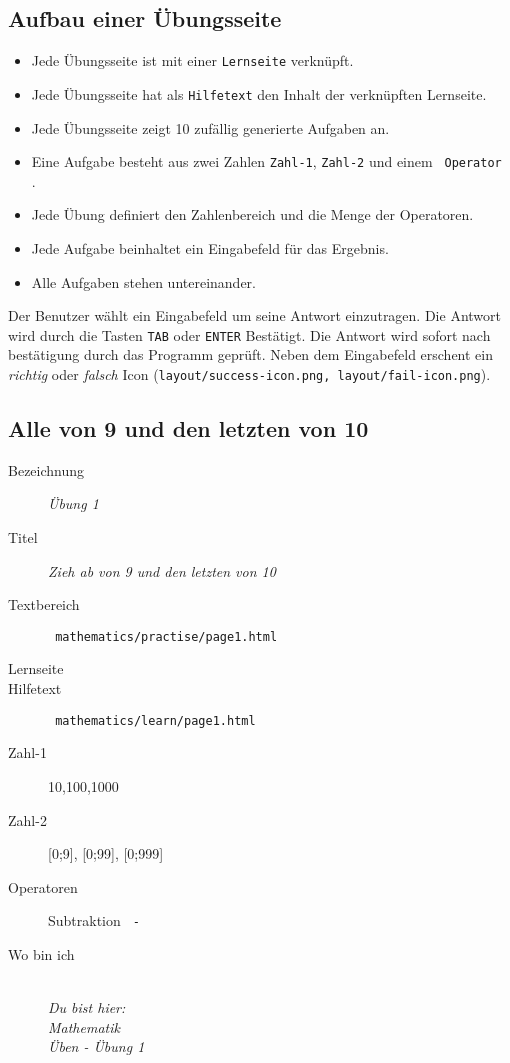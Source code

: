 \subsection{ Aufbau einer Übungsseite }
\label{cha:math-practise-structure}
\begin{itemize}
  \item Jede Übungsseite ist mit einer \texttt{Lernseite} verknüpft.
  \item Jede Übungsseite hat als \texttt{Hilfetext} den Inhalt der verknüpften Lernseite.
  \item Jede Übungsseite zeigt 10 zufällig generierte Aufgaben an.
  \item Eine Aufgabe besteht aus zwei Zahlen \texttt{Zahl-1}, \texttt{Zahl-2} und einem \texttt{ Operator }.
  \item Jede Übung definiert den Zahlenbereich und die Menge der Operatoren.
  \item Jede Aufgabe beinhaltet ein Eingabefeld für das Ergebnis.
  \item Alle Aufgaben stehen untereinander.
\end{itemize}

Der Benutzer wählt ein Eingabefeld um seine Antwort einzutragen. Die Antwort wird durch die Tasten \texttt{TAB} oder \texttt{ENTER} Bestätigt. Die Antwort wird sofort nach bestätigung durch das Programm geprüft. Neben dem Eingabefeld erschent ein \emph{richtig} oder \emph{falsch} Icon (\texttt{layout/success-icon.png, layout/fail-icon.png}).



\subsection{ Alle von 9 und den letzten von 10 }
\label{cha:math-practise-page1}
\begin{description}
  \item[Bezeichnung] \emph{ Übung 1 }
  \item[Titel] \emph{ Zieh ab von 9 und den letzten von 10 }
  \item[Textbereich] \texttt{ mathematics/practise/page1.html }
  \item[Lernseite] 
  \item[Hilfetext] \texttt{ mathematics/learn/page1.html }
  \item[Zahl-1] {10,100,1000}
  \item[Zahl-2] {[0;9], [0;99], [0;999]}
  \item[Operatoren] Subtraktion \texttt{ - }
  \item[Wo bin ich] \emph{\\Du bist hier:\\Mathematik\\Üben - Übung 1}
\end{description}



